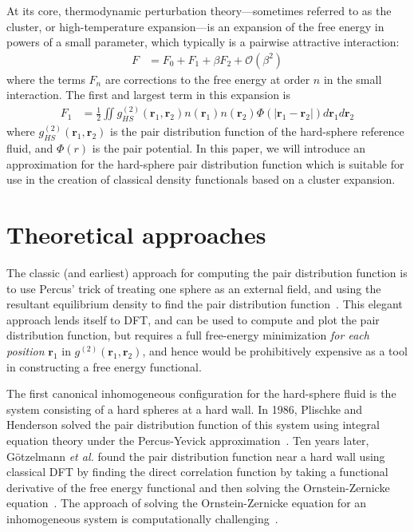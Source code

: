 \documentclass[letterpaper,twocolumn,amsmath,amssymb,pre,aps,10pt]{revtex4-1}
\newcommand{\rr}{\textbf{r}}
\begin{document}
At its core, thermodynamic perturbation theory---sometimes referred to
as the cluster, or high-temperature expansion---is an expansion of the
free energy in powers of a small parameter, which typically is a
pairwise attractive interaction:
\begin{align}
  F &= F_0 + F_1 + \beta F_2 + \mathcal{O}(\beta^2)
\end{align}
where the terms $F_n$ are corrections to the free energy at order $n$
in the small interaction.  The first and largest term in this
expansion is
\begin{align}
  F_1 &= \tfrac12 \iint g^{(2)}_{HS}(\rr_1,\rr_2)n(\rr_1)n(\rr_2)\Phi(|\rr_1-\rr_2|) d\rr_1d\rr_2
\end{align}
where $g^{(2)}_{HS}(\rr_1,\rr_2)$ is the pair distribution function of
the hard-sphere reference fluid, and $\Phi(r)$ is the pair potential.
In this paper, we will introduce an approximation for the hard-sphere
pair distribution function which is suitable for use in the creation
of classical density functionals based on a cluster expansion.

\section{Theoretical approaches}

The classic (and earliest) approach for computing the pair
distribution function is to use Percus' trick of treating one sphere
as an external field, and using the resultant equilibrium density to
find the pair distribution function~\cite{hansen2006theory}.  This
elegant approach lends itself to DFT, and can be used to compute and
plot the pair distribution function, but requires a full free-energy
minimization \emph{for each position} $\rr_1$ in
$g^{(2)}(\rr_1,\rr_2)$, and hence would be prohibitively expensive as
a tool in constructing a free energy functional.

The first canonical inhomogeneous configuration for the hard-sphere
fluid is the system consisting of a hard spheres at a hard wall.  In
1986, Plischke and Henderson solved the pair distribution function of
this system using integral equation theory under the Percus-Yevick
approximation~\cite{plischke1986pair}.  Ten years later,
G{\"o}tzelmann \emph{et al.} found the pair distribution function near
a hard wall using classical DFT by finding the direct correlation
function by taking a functional derivative of the free energy
functional and then solving the Ornstein-Zernicke
equation~\cite{gotzelmann1996structure}.  The approach of solving the
Ornstein-Zernicke equation for an inhomogeneous system is
computationally challenging~\cite{paul2003variational}.
\end{document}
